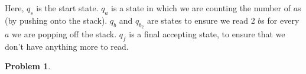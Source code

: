 \documentclass[11pt]{article}
\theoremstyle{definition}
\theoremstyle{case}
\theoremstyle{theorem}
\newtheorem{prob}{Problem}
\begin{document}
Here, $q_s$ is the start state. $q_a$ is a state in which we are counting the number of $a$s 
(by pushing onto the stack). $q_b$ and $q_{b_2}$ are states to ensure we read 2 $b$s for every
$a$ we are popping off the stack. $q_f$ is a final accepting state, to ensure that we don't have
anything more to read.

\begin{prob}\end{prob}




\begin{tikzpicture}[x=0.75pt,y=0.75pt,yscale=-1,xscale=1]


\end{tikzpicture}
\end{document}
